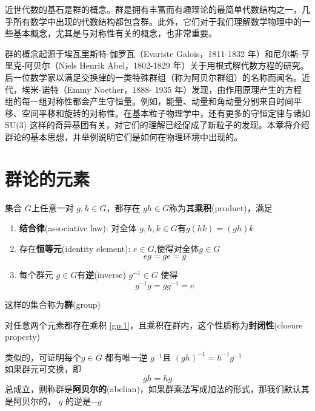 近世代数的基石是群的概念。群是拥有丰富而有趣理论的最简单代数结构之一，几乎所有数学中出现的代数结构都包含群。此外，它们对于我们理解数学物理中的一些基本概念，尤其是与对称性有关的概念，也非常重要。

群的概念起源于埃瓦里斯特-伽罗瓦（Evariste Galois，1811-1832 年）和尼尔斯-亨里克-阿贝尔（Niels Henrik Abel，1802-1829 年）关于用根式解代数方程的研究。后一位数学家以满足交换律的一类特殊群组（称为阿贝尔群组）的名称而闻名。近代，埃米-诺特（Emmy Noether，1888- 1935 年）发现，由作用原理产生的方程组的每一组对称性都会产生守恒量。例如，能量、动量和角动量分别来自时间平移、空间平移和旋转的对称性。在基本粒子物理学中，还有更多的守恒定律与诸如 SU(3) 这样的奇异基团有关，对它们的理解已经促成了新粒子的发现。本章将介绍群论的基本思想，并举例说明它们是如何在物理环境中出现的。
\section{群论的元素}\label{sec:2.1}
集合 $G$上任意一对 $g,h\in G$，都存在 $gh\in G$称为其\textbf{乘积}(product)，满足
\begin{enumerate}[label=(Gp\arabic*),ref=Gp\arabic*]
    \item \label{gp:1}
    \textbf{结合律}(associative law): 对全体 $g,h,k\in G$有$g(hk)=(gh)k$  
    \item \label{gp:2}
    存在\textbf{恒等元}(identity element): $e\in G$,使得对全体\(g\in G\)
    \[eg=ge=g\]
    \item \label{gp:3}
    每个群元 $g\in G$有\textbf{逆}(inverse) $g^{-1}\in G$ 使得\[g^{-1}g=gg^{-1}=e\] 
\end{enumerate}
这样的集合称为\textbf{群}(group)

对任意两个元素都存在乘积 \ref{gp:1}，且乘积在群内，这个性质称为\textbf{封闭性}(closure property)

类似的，可证明每个$g\in G$ 都有唯一逆 $g^{-1}$且 $(gh)^{-1}=h^{-1}g^{-1}$ 
\\
如果群元可交换，即\[gh=hg\]总成立，则称群是\textbf{阿贝尔的}(abelian)，如果群乘法写成加法的形式，那我们默认其是阿贝尔的， $g$ 的逆是$-g$ 

